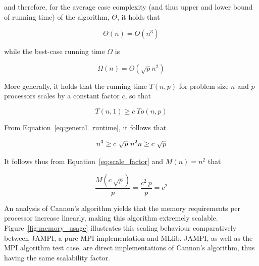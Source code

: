 \documentclass[fleqn,10pt]{SelfArx} %
\begin{document}
\noindent and therefore, for the average case complexity (and thus upper and lower bound of running time) of the algorithm, $\Theta$, it holds that

\begin{equation}
	\Theta(n) = O(n^3)
\end{equation}

\noindent while the best-case running time $\Omega$ is

\begin{equation}
	\Omega(n) = O(\sqrt{p} n^2)
\end{equation}

\noindent More generally, it holds that the running time $T(n, p)$ for problem size $n$ and $p$ processors scales by a constant factor $c$, so that

\begin{equation}
	T(n, 1) \geq c \ To(n, p)
	\label{eq:general_runtime}
\end{equation}

\noindent From Equation~\eqref{eq:general_runtime}, it follows that

\begin{equation}
	n^3 \geq c \ \sqrt{p} \ n^2 \\
	n \geq c \ \sqrt{p}
	\label{eq:scale_factor}
\end{equation}

\noindent It follows thus from Equation~\eqref{eq:scale_factor} and $M(n) = n^2$ that

\begin{equation}
	\frac{M(c \ \sqrt{p})}{p} = \frac{c^2 \ p}{p} = c^2
\end{equation}

An analysis of Cannon's algorithm yields that the memory requirements per processor increase linearly, making this algorithm extremely scalable. Figure~\ref{fig:memory_usage} illustrates this scaling behaviour comparatively between JAMPI, a pure MPI implementation and MLlib. JAMPI, as well as the MPI algorithm test case, are direct implementations of Cannon's algorithm, thus having the same scalability factor. 
\end{document}

